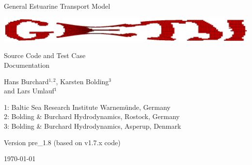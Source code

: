 \documentclass[a4paper,twoside]{article}
\begin{document}
\begin{titlepage}

\vfill

{\sf \bf \huge
 \begin{center}
   General Estuarine Transport Model
 \end{center}
}
\begin{center}
\includegraphics[width=\linewidth]{./figures/GETM2.ps}
\end{center}

\vspace{6mm}

{\sf \bf \LARGE
 \begin{center}
   Source Code and Test Case \\ Documentation
 \end{center}
}

{\sf \bf \LARGE
 \begin{center}
Hans Burchard$^{1,2}$, Karsten Bolding$^3$\\ and Lars Umlauf$^1$   
 \end{center}
}


\vspace{6mm}

{\sf \bf \Large
 \begin{center}
 1: Baltic Sea Research Institute Warnem\"unde, Germany \\
 2: Bolding \& Burchard Hydrodynamics, Rostock, Germany \\
 3: Bolding \& Burchard Hydrodynamics, Asperup, Denmark
 \end{center}
}


\vspace{5mm}

{\sf \bf \Large
 \begin{center}
  Version pre\_1.8 (based on v1.7.x code)
 \end{center}
}

\vfill


{\sf \bf \Large
 \begin{center}
\today
 \end{center}
}

\vfill

\end{titlepage}


\cleardoublepage
\tableofcontents
\end{document}
